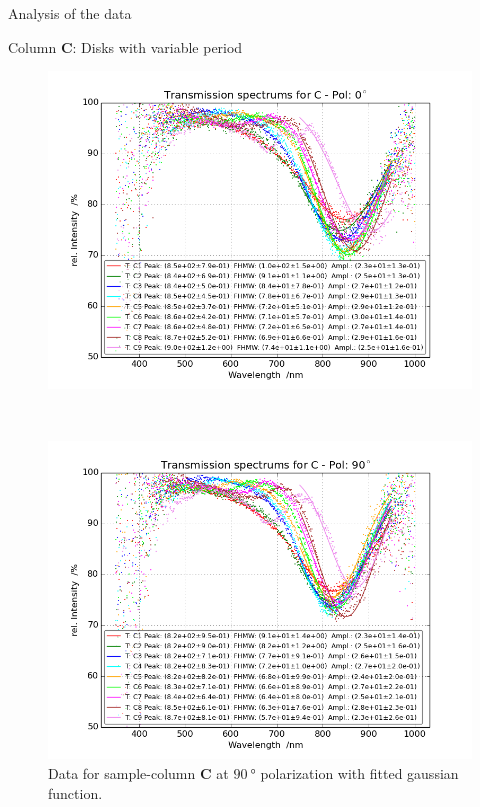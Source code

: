 \documentclass[pdftex, a4paper,11pt, twoside, UKenglish]{report}
\begin{document}
\begin{chapter}{Analysis of the data}
\begin{section}{Column \textbf{C}: Disks with variable period}
\begin{figure}[ht!]
\begin{minipage}{.95\textwidth}
          \includegraphics[width=\textwidth]
              {Figures/TransspecFIT_CPol0.png}
          \caption{Data for sample-column \textbf{C} at $\SI{0}{\degree}$
              polarization with fitted gaussian function.}
          \label{fig:TransspecFIT_CPol0}
        \end{minipage}\\
        \begin{minipage}{.95\textwidth}
          \centering
          \includegraphics[width=\textwidth]
              {Figures/TransspecFIT_CPol90.png}
          \caption{Data for sample-column \textbf{C} at $\SI{90}{\degree}$
              polarization with fitted gaussian function.}
          \label{fig:TransspecFIT_CPol90}
        \end{minipage}
      \end{figure}
      

\end{section}
\end{chapter}
\end{document}
